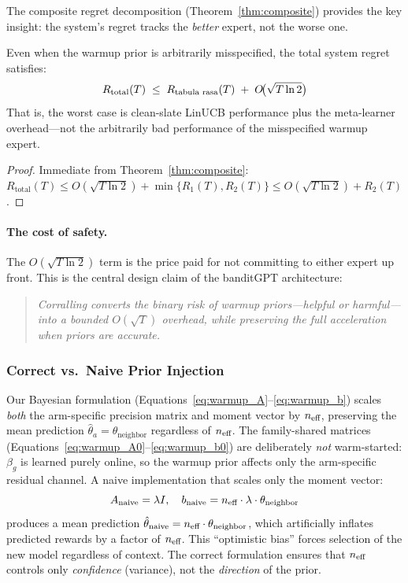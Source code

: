 The composite regret decomposition (Theorem~\ref{thm:composite}) provides the
key insight: the system's regret tracks the \emph{better} expert, not the
worse one.

\begin{corollary}
\label{cor:neg_transfer}
Even when the warmup prior is arbitrarily misspecified, the total system regret
satisfies:
\begin{equation}
R_{\textnormal{total}}(T)
\;\leq\;
R_{\textnormal{tabula rasa}}(T)
\;+\;
O\!\bigl(\sqrt{T \ln 2}\bigr)
\label{eq:neg_transfer_bound}
\end{equation}
That is, the worst case is clean-slate LinUCB performance plus the meta-learner
overhead---not the arbitrarily bad performance of the misspecified warmup expert.
\end{corollary}

\begin{proof}
Immediate from Theorem~\ref{thm:composite}: $R_{\text{total}}(T) \leq
O(\sqrt{T \ln 2}) + \min\{R_1(T), R_2(T)\} \leq O(\sqrt{T \ln 2}) + R_2(T)$.
\end{proof}

\paragraph{The cost of safety.}
The $O(\sqrt{T \ln 2})$ term is the price paid for not committing to either
expert up front.  This is the central design claim of the banditGPT
architecture:

\begin{quote}
\emph{Corralling converts the binary risk of warmup priors---helpful or
harmful---into a bounded $O(\sqrt{T})$ overhead, while preserving the full
acceleration when priors are accurate.}
\end{quote}

\subsubsection{Correct vs.\ Naive Prior Injection}
\label{appendix:naive_vs_correct}

Our Bayesian formulation
(Equations~\eqref{eq:warmup_A}--\eqref{eq:warmup_b}) scales \emph{both} the
arm-specific precision matrix and moment vector by $n_{\text{eff}}$, preserving the
mean prediction $\hat{\theta}_a = \theta_{\text{neighbor}}$ regardless of
$n_{\text{eff}}$.  The family-shared matrices
(Equations~\eqref{eq:warmup_A0}--\eqref{eq:warmup_b0}) are deliberately
\emph{not} warm-started: $\beta_g$ is learned purely online, so the warmup
prior affects only the arm-specific residual channel.
A naive implementation that scales only the moment vector:
\begin{equation}
A_{\text{naive}} = \lambda I, \quad b_{\text{naive}} = n_{\text{eff}} \cdot \lambda \cdot \theta_{\text{neighbor}}
\end{equation}
produces a mean prediction $\hat{\theta}_{\text{naive}} = n_{\text{eff}} \cdot
\theta_{\text{neighbor}}$, which artificially inflates predicted rewards by a
factor of $n_{\text{eff}}$.  This ``optimistic bias'' forces selection of the new model
regardless of context.  The correct formulation ensures that $n_{\text{eff}}$ controls
only \emph{confidence} (variance), not the \emph{direction} of the prior.

